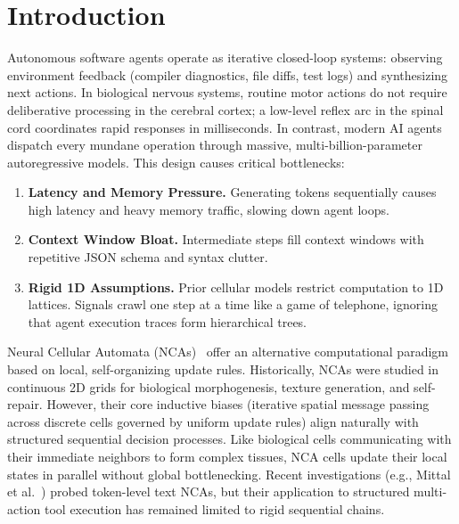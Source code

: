 \documentclass[10pt,twocolumn,letterpaper]{article}
\begin{document}
\section{Introduction}
Autonomous software agents operate as iterative closed-loop systems: observing environment feedback (compiler diagnostics, file diffs, test logs) and synthesizing next actions. In biological nervous systems, routine motor actions do not require deliberative processing in the cerebral cortex; a low-level reflex arc in the spinal cord coordinates rapid responses in milliseconds. In contrast, modern AI agents dispatch every mundane operation through massive, multi-billion-parameter autoregressive models. This design causes critical bottlenecks:
\begin{enumerate}[leftmargin=1.5em, itemsep=0.1em]
  \item \textbf{Latency and Memory Pressure.} Generating tokens sequentially causes high latency and heavy memory traffic, slowing down agent loops.
  \item \textbf{Context Window Bloat.} Intermediate steps fill context windows with repetitive JSON schema and syntax clutter.
  \item \textbf{Rigid 1D Assumptions.} Prior cellular models restrict computation to 1D lattices. Signals crawl one step at a time like a game of telephone, ignoring that agent execution traces form hierarchical trees.
\end{enumerate}

Neural Cellular Automata (NCAs)~\cite{mordvintsev2020growing} offer an alternative computational paradigm based on local, self-organizing update rules. Historically, NCAs were studied in continuous 2D grids for biological morphogenesis, texture generation, and self-repair. However, their core inductive biases (iterative spatial message passing across discrete cells governed by uniform update rules) align naturally with structured sequential decision processes. Like biological cells communicating with their immediate neighbors to form complex tissues, NCA cells update their local states in parallel without global bottlenecking. Recent investigations (e.g., Mittal et al.~\cite{mittal2026textnca}) probed token-level text NCAs, but their application to structured multi-action tool execution has remained limited to rigid sequential chains.
\end{document}
